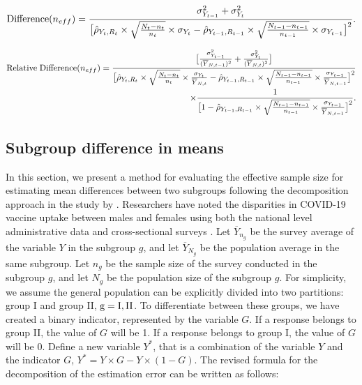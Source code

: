 \documentclass{article}
\begin{document}
\begin{align*}
    {\rm Difference}(n_{eff}) = \frac{\sigma_{Y_{t-1}}^2 + \sigma_{Y_t}^2}{\big[\hat{\rho}_{Y_t, R_t} \times \sqrt{\frac{N_t - n_t}{n_t}} \times \sigma_{Y_t} -\hat{\rho}_{Y_{t-1}, R_{t-1}} \times \sqrt{\frac{N_{t-1} - n_{t-1}}{n_{t-1}}} \times \sigma_{Y_{t-1}}\big]^2}.
\end{align*}

\begin{align*}
{\rm Relative \; Difference}(n_{eff}) = \frac{\big[\frac{\sigma_{Y_{t-1}}^2}{(\overline{Y}_{N,t-1})^2} + \frac{\sigma_{Y_t}^2}{(\overline{Y}_{N,t})^2}\big]} {\big[\hat{\rho}_{Y_t, R_t} \times \sqrt{\frac{N_t - n_t}{n_t}} \times \frac{\sigma_{Y_t}}{\overline{Y}_{N,t}} - \hat{\rho}_{Y_{t-1}, R_{t-1}} \times \sqrt{\frac{N_{t-1} - n_{t-1}}{n_{t-1}}} \times \frac{\sigma_{Y_{t-1}}}{\overline{Y}_{N,{t-1}}} \big]^2} \\
\times \frac{1}{\big[1 - \hat{\rho}_{Y_{t-1}, R_{t-1}} \times \sqrt{\frac{N_{t-1} - n_{t-1}}{n_{t-1}}} \times \frac{\sigma_{Y_{t-1}}}{\overline{Y}_{N,{t-1}}} \big]^2}.    
\end{align*}

\subsection{Subgroup difference in means}
In this section, we present a method for evaluating the effective sample size for estimating mean differences between two subgroups following the decomposition approach in the study by \cite{Meng2018}. Researchers have noted the disparities in COVID-19 vaccine uptake between males and females using both the national level administrative data and cross-sectional surveys \citep{Hall2021-wo, Nassiri-Ansari2022-pp}. Let $\overline{Y}_{n_g}$ be the survey average of the variable $Y$ in the subgroup $g$, and let $\overline{Y}_{N_g}$ be the population average in the same subgroup. Let $n_g$ be the sample size of the survey conducted in the subgroup $g$, and let $N_g$ be the population size of the subgroup $g$. For simplicity, we assume the general population can be explicitly divided into two partitions: group I and group II, $\rm g = I, II$. To differentiate between these groups, we have created a binary indicator, represented by the variable $G$. If a response belongs to group II, the value of $G$ will be 1. If a response belongs to group I, the value of $G$ will be 0. Define a new variable $Y^{*}$, that is a combination of the variable $Y$ and the indicator $G$, $Y^{*} = Y \times G - Y \times (1-G)$. The revised formula for the decomposition of the estimation error can be written as follows: 
\end{document}
